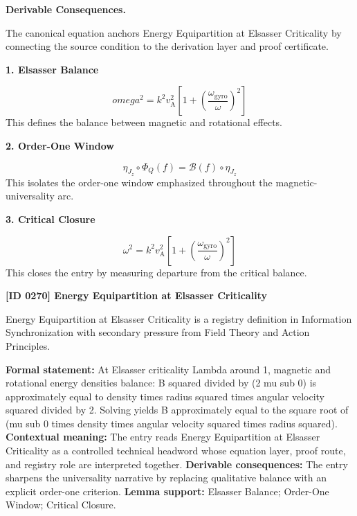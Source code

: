 \par\vspace{0.35em}
\noindent\textbf{Derivable Consequences.}\quad
\begingroup
\footnotesize
\raggedright
The canonical equation anchors Energy Equipartition at Elsasser Criticality by connecting the source condition to the derivation layer and proof certificate.
\par\endgroup

\noindent\textbf{1. Elsasser Balance}\par
\[
omega^{2} = k^{2} v_{\mathrm{A}}^{2}\left[1 + \left(\frac{\omega_{\mathrm{gyro}}}{\omega}\right)^{2}\right]
\]
\noindent This defines the balance between magnetic and rotational effects.\par
\noindent\textbf{2. Order-One Window}\par
\[
\eta_{J_z}\circ\Phi_Q(f)=\mathcal{B}(f)\circ\eta_{J_z}
\]
\noindent This isolates the order-one window emphasized throughout the magnetic-universality arc.\par
\noindent\textbf{3. Critical Closure}\par
\[
\omega^{2} = k^{2} v_{\mathrm{A}}^{2}\left[1 + \left(\frac{\omega_{\mathrm{gyro}}}{\omega}\right)^{2}\right]
\]
\noindent This closes the entry by measuring departure from the critical balance.\par

\clearpage
\noindent\textbf{[ID 0270] Energy Equipartition at Elsasser Criticality}\par
\vspace{0.35em}
\begingroup\small
{}
Energy Equipartition at Elsasser Criticality is a registry definition in Information Synchronization with secondary pressure from Field Theory and Action Principles.

\begingroup\footnotesize\setlength{\emergencystretch}{3em}\sloppy
\textbf{Formal statement:} At Elsasser criticality Lambda around 1, magnetic and rotational energy densities balance: B squared divided by (2 mu sub 0) is approximately equal to density times radius squared times angular velocity squared divided by 2. Solving yields B approximately equal to the square root of (mu sub 0 times density times angular velocity squared times radius squared). \textbf{Contextual meaning:} The entry reads Energy Equipartition at Elsasser Criticality as a controlled technical headword whose equation layer, proof route, and registry role are interpreted together. \textbf{Derivable consequences:} The entry sharpens the universality narrative by replacing qualitative balance with an explicit order-one criterion. \textbf{Lemma support:} Elsasser Balance; Order-One Window; Critical Closure.\par
\endgroup

